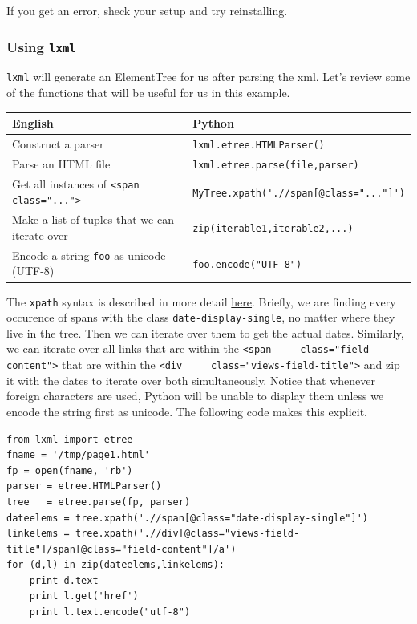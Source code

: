 \documentclass[11pt]{article}
\begin{document}
    If you get an error, sheck your setup and try reinstalling.
    
\subsubsection{Using \texttt{lxml}}
\label{sec-5-3-2}


    \texttt{lxml} will generate an ElementTree for us after parsing the xml.
    Let's review some of the functions that will be useful for us in
    this example.


\begin{center}
\begin{tabular}{l|l}
 English                                         &  Python                                        \\
\hline
 Construct a parser                              &  \texttt{lxml.etree.HTMLParser()}              \\
 Parse an HTML file                              &  \texttt{lxml.etree.parse(file,parser)}        \\
 Get all instances of \verb~<span class="...">~  &  \verb~MyTree.xpath('.//span[@class="..."]')~  \\
 Make a list of tuples that we can iterate over  &  \texttt{zip(iterable1,iterable2,...)}         \\
 Encode a string \verb~foo~ as unicode (UTF-8)   &  \verb~foo.encode("UTF-8")~                    \\
\end{tabular}
\end{center}



    The \texttt{xpath} syntax is described in more detail \href{http://effbot.org/zone/element-xpath.htm}{here}.  Briefly, we
    are finding every occurence of spans with the class
    \texttt{date-display-single}, no matter where they live in the tree.
    Then we can iterate over them to get the actual dates.  Similarly,
    we can iterate over all links that are within the \verb~<span     class="field content">~ that are within the \verb~<div     class="views-field-title">~ and zip it with the dates to iterate
    over both simultaneously.  Notice that whenever foreign characters
    are used, Python will be unable to display them unless we encode
    the string first as unicode.  The following code makes this explicit.


\begin{verbatim}
from lxml import etree
fname = '/tmp/page1.html'
fp = open(fname, 'rb')
parser = etree.HTMLParser()
tree   = etree.parse(fp, parser)
dateelems = tree.xpath('.//span[@class="date-display-single"]')
linkelems = tree.xpath('.//div[@class="views-field-title"]/span[@class="field-content"]/a')     
for (d,l) in zip(dateelems,linkelems):
    print d.text
    print l.get('href')         
    print l.text.encode("utf-8")
\end{verbatim}
\end{document}
